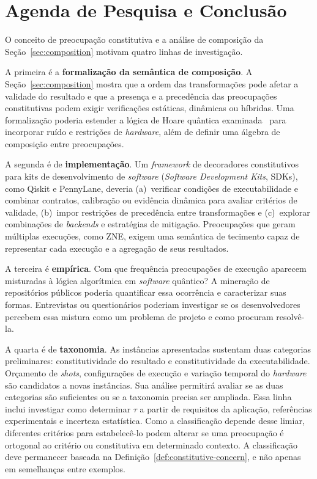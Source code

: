 \documentclass[sigconf]{acmart}
\begin{document}
\section{Agenda de Pesquisa e Conclusão}
\label{sec:conclusion}

O conceito de preocupação constitutiva e a análise de composição da Seção~\ref{sec:composition} motivam quatro linhas de investigação.

A primeira é a \textbf{formalização da semântica de composição}. A Seção~\ref{sec:composition} mostra que a ordem das transformações pode afetar a validade do resultado e que a presença e a precedência das preocupações constitutivas podem exigir verificações estáticas, dinâmicas ou híbridas. Uma formalização poderia estender a lógica de Hoare quântica examinada~\cite{hoare_quantum} para incorporar ruído e restrições de \textit{hardware}, além de definir uma álgebra de composição entre preocupações.

A segunda é de \textbf{implementação}. Um \textit{framework} de decoradores constitutivos para kits de desenvolvimento de \textit{software} (\textit{Software Development Kits}, SDKs), como Qiskit e PennyLane, deveria (a)~verificar condições de executabilidade e combinar contratos, calibração ou evidência dinâmica para avaliar critérios de validade, (b)~impor restrições de precedência entre transformações e (c)~explorar combinações de \textit{backends} e estratégias de mitigação. Preocupações que geram múltiplas execuções, como ZNE, exigem uma semântica de tecimento capaz de representar cada execução e a agregação de seus resultados.

A terceira é \textbf{empírica}. Com que frequência preocupações de execução aparecem misturadas à lógica algorítmica em \textit{software} quântico? A mineração de repositórios públicos poderia quantificar essa ocorrência e caracterizar suas formas. Entrevistas ou questionários poderiam investigar se os desenvolvedores percebem essa mistura como um problema de projeto e como procuram resolvê-la.

A quarta é de \textbf{taxonomia}. As instâncias apresentadas sustentam duas categorias preliminares: constitutividade do resultado e constitutividade da executabilidade. Orçamento de \textit{shots}, configurações de execução e variação temporal do \textit{hardware} são candidatos a novas instâncias. Sua análise permitirá avaliar se as duas categorias são suficientes ou se a taxonomia precisa ser ampliada. Essa linha inclui investigar como determinar $\tau$ a partir de requisitos da aplicação, referências experimentais e incerteza estatística. Como a classificação depende desse limiar, diferentes critérios para estabelecê-lo podem alterar se uma preocupação é ortogonal ao critério ou constitutiva em determinado contexto. A classificação deve permanecer baseada na Definição~\ref{def:constitutive-concern}, e não apenas em semelhanças entre exemplos.
\end{document}

